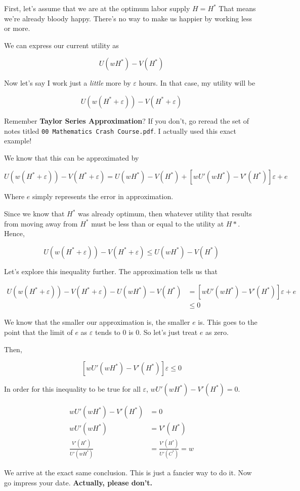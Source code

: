 \documentclass[11pt]{scrartcl}
\newcommand{\ve}{\varepsilon}
\begin{document}
First, let's assume that we are at the optimum labor supply $H=H^*$ That means we're already bloody happy. There's no way to make us happier by working less or more. 

We can express our current utility as

\[U(wH^*) - V(H^*)\]

Now let's say I work just a \emph{little} more by $\ve$ hours. In that case, my utility will be 

\[U(w(H^*+\ve)) - V(H^*+\ve)\]

Remember \textbf{Taylor Series Approximation}? If you don't, go reread the set of notes titled \lstinline{00 Mathematics Crash Course.pdf}. I actually used this exact example!

We know that this can be approximated by

\[ U(w(H^*+\ve)) - V(H^*+\ve) = U(wH^*) - V(H^*) + [wU'(wH^*) - V'(H^*)]\ve + e \]

Where $e$ simply represents the error in approximation.

Since we know that $H^*$ was already optimum, then whatever utility that results from moving away from $H^*$ must be less than or equal to the utility at $H*$. Hence,

\[ U(w(H^*+\ve)) - V(H^*+\ve) \leq U(wH^*) - V(H^*) \]

Let's explore this inequality further. The approximation tells us that

\begin{align*}
U(w(H^*+\ve)) - V(H^*+\ve) - U(wH^*) - V(H^*) &= [wU'(wH^*) - V'(H^*)]\ve + e \\
&\leq 0
\end{align*}

We know that the smaller our approximation is, the smaller $e$ is. This goes to the point that the limit of $e$ as $\ve$ tends to $0$ is $0$. So let's just treat $e$ as zero.

Then,

\[ [wU'(wH^*) - V'(H^*)]\ve \leq 0 \]

In order for this inequality to be true for all $\ve$, $wU'(wH^*) - V'(H^*) = 0$.

\begin{align*}
wU'(wH^*) - V'(H^*) &= 0 \\
wU'(wH^*) &= V'(H^*) \\
\frac{V'(H^*)}{U'(wH^*)} &= \frac{V'(H^*)}{U'(C^*)} = w
\end{align*}

We arrive at the exact same conclusion. This is just a fancier way to do it. Now go impress your date. \textbf{Actually, please don't.}
\end{document}

